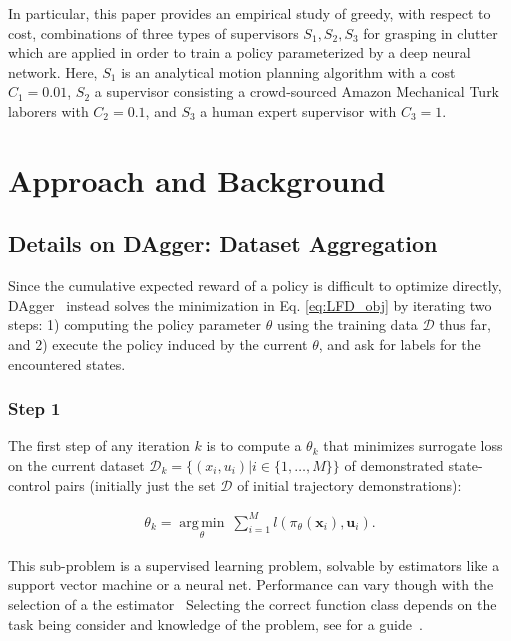 \documentclass[10pt, conference]{ieeeconf}      %
\DeclareMathOperator*{\argmin}{arg\,min}
\newcommand{\bu}{\mathbf{u}}
\newcommand{\bx}{\mathbf{x}}
\begin{document}
 In particular, this paper provides an empirical study of greedy, with respect to cost, combinations of three types of supervisors $S_1,
S_2, S_3$ for grasping in clutter which are applied in order to train a policy parameterized by a deep neural network.
Here, $S_1$ is an analytical motion planning algorithm with a cost $C_1=0.01$, $S_2$ a supervisor
consisting a crowd-sourced Amazon Mechanical Turk laborers with $C_2=0.1$, and $S_3$ a human expert supervisor with
$C_3=1$.

\section{Approach and Background}
 \subsection{Details on DAgger: Dataset Aggregation}
Since the cumulative expected reward of a policy is difficult to optimize directly,
DAgger~\cite{ross2010reduction} instead solves the minimization in Eq. \ref{eq:LFD_obj} by iterating two steps: 1)
computing the policy parameter $\theta$ using the training data $\mathcal{D}$ thus far, and 2) execute the policy induced by the current $\theta$, and ask for labels for the encountered states. 
 
\subsubsection{Step 1}
The first step of any iteration $k$ is to compute a $\theta_k$ that minimizes surrogate loss on the current dataset $\mathcal{D}_k=\{(x_i,u_i)|i\in\{1,\ldots,M\}\}$ of demonstrated state-control pairs (initially just the set $\mathcal{D}$ of initial trajectory demonstrations):

 \vspace{-1ex}
\begin{align}\label{eq:super_objj}
\theta_{k} = \underset{\theta}{\argmin} \: \sum_{i=1}^{M} l(\pi_{\theta}(\bx_i),\bu_i).
\end{align}

This sub-problem is a supervised learning problem, solvable by estimators like a support vector machine or a neural net. Performance can vary though with the selection of a the estimator~ Selecting the correct function class depends on the task being consider and knowledge of the problem, see for a guide~\cite{scholkopf2002learning}. 
 
\end{document}
